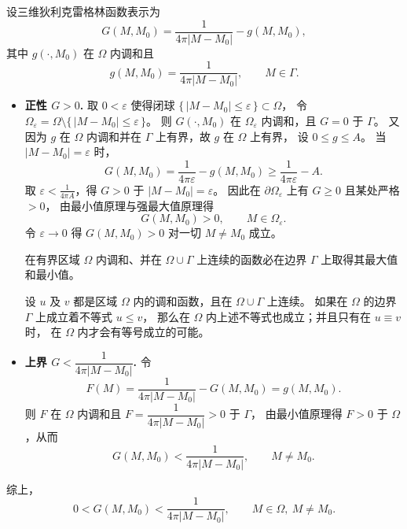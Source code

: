 \begin{solution}
设三维狄利克雷格林函数表示为
\[
G(M,M_0)=\frac1{4\pi|M-M_0|}-g(M,M_0),
\]
其中 $g(\cdot,M_0)$ 在 $\Omega$ 内调和且
\[
g(M,M_0)=\frac1{4\pi|M-M_0|},\qquad M\in\Gamma.
\]

\begin{itemize}
\item \textbf{正性 $G>0$.}
取 $0<\varepsilon$ 使得闭球 $\{\,|M-M_0|\le\varepsilon\,\}\subset\Omega$，
令 $\Omega_\varepsilon=\Omega\setminus\{\,|M-M_0|\le\varepsilon\,\}$。
则 $G(\cdot,M_0)$ 在 $\Omega_\varepsilon$ 内调和，且 $G=0$ 于 $\Gamma$。
又因为 $g$ 在 $\Omega$ 内调和并在 $\Gamma$ 上有界，故 $g$ 在 $\Omega$ 上有界，
设 $0\le g\le A$。
当 $|M-M_0|=\varepsilon$ 时，
\[
G(M,M_0)=\frac1{4\pi\varepsilon}-g(M,M_0)\ge \frac1{4\pi\varepsilon}-A.
\]
取 $\varepsilon<\frac1{4\pi A}$，得 $G>0$ 于 $|M-M_0|=\varepsilon$。
因此在 $\partial\Omega_\varepsilon$ 上有 $G\ge0$ 且某处严格 $>0$，
由最小值原理与强最大值原理得
\[
G(M,M_0)>0,\qquad M\in\Omega_\varepsilon.
\]
令 $\varepsilon\to0$ 得 $G(M,M_0)>0$ 对一切 $M\neq M_0$ 成立。
\begin{corollary}[推论 1]
在有界区域 $\Omega$ 内调和、并在 $\Omega\cup\Gamma$ 上连续的函数必在边界 $\Gamma$ 上取得其最大值和最小值。
\end{corollary}

\begin{corollary}[推论 2]
设 $u$ 及 $v$ 都是区域 $\Omega$ 内的调和函数，且在 $\Omega\cup\Gamma$ 上连续。
如果在 $\Omega$ 的边界 $\Gamma$ 上成立着不等式 $u\le v$，
那么在 $\Omega$ 内上述不等式也成立；并且只有在 $u\equiv v$ 时，
在 $\Omega$ 内才会有等号成立的可能。
\end{corollary}
\item \textbf{上界 $G<\dfrac1{4\pi|M-M_0|}$.}
令
\[
F(M)=\frac1{4\pi|M-M_0|}-G(M,M_0)=g(M,M_0).
\]
则 $F$ 在 $\Omega$ 内调和且 $F=\dfrac1{4\pi|M-M_0|}>0$ 于 $\Gamma$，
由最小值原理得 $F>0$ 于 $\Omega$，从而
\[
G(M,M_0)<\frac1{4\pi|M-M_0|},\qquad M\neq M_0.
\]
\end{itemize}

综上，
\[
0<G(M,M_0)<\frac1{4\pi|M-M_0|},\qquad M\in\Omega,\ M\neq M_0.
\]
\end{solution}
